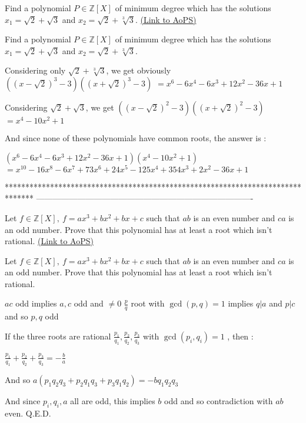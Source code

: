 \begin{problem}
	Find a polynomial $P\in \mathbb{Z}[X]$ of minimum degree which has the solutions $x_1=\sqrt{2}+\sqrt{3}$ and $x_2=\sqrt{2}+\sqrt[3]{3}$.
	\flushright \href{https://artofproblemsolving.com/community/c6h393654}{(Link to AoPS)}
\end{problem}



\begin{solution}
	\begin{tcolorbox}Find a polynomial $P\in \mathbb{Z}[X]$ of minimum degree which has the solutions $x_1=\sqrt{2}+\sqrt{3}$ and $x_2=\sqrt{2}+\sqrt[3]{3}$.\end{tcolorbox}
Considering only $\sqrt 2+\sqrt[3]3$, we get obviously $((x-\sqrt2)^3-3)((x+\sqrt 2)^3-3)$ $=x^6-6x^4-6x^3+12x^2-36x+1$

Considering $\sqrt 2+\sqrt 3$, we get $((x-\sqrt 2)^2-3)((x+\sqrt 2)^2-3)$ $=x^4-10x^2+1$

And since none of these polynomials have common roots, the answer is :

$(x^6-6x^4-6x^3+12x^2-36x+1)(x^4-10x^2+1)$ $=x^{10}-16x^8-6x^7+73x^6+24x^5-125x^4+354x^3+2x^2-36x+1$
\end{solution}
*******************************************************************************
-------------------------------------------------------------------------------

\begin{problem}
	Let $f\in \mathbb{Z}[X],\ f=ax^3+bx^2+bx+c$ such that $ab$ is an even number and $ca$ is an odd number. Prove that this polynomial has at least a root which isn't rational.
	\flushright \href{https://artofproblemsolving.com/community/c6h393855}{(Link to AoPS)}
\end{problem}



\begin{solution}
	\begin{tcolorbox}Let $f\in \mathbb{Z}[X],\ f=ax^3+bx^2+bx+c$ such that $ab$ is an even number and $ca$ is an odd number. Prove that this polynomial has at least a root which isn't rational.\end{tcolorbox}
$ac$ odd implies $a,c$ odd and $\ne 0$
$\frac pq$ root with $\gcd(p,q)=1$ implies $q|a$ and $p|c$ and so $p,q$ odd

If the three roots are rational $\frac {p_1}{q_1},\frac {p_2}{q_2},\frac {p_3}{q_3}$ with $\gcd(p_i,q_i)=1$ , then :

$\frac {p_1}{q_1}+\frac {p_2}{q_2}+\frac {p_3}{q_3}=-\frac ba$

And so $a(p_1q_2q_3+p_2q_1q_3+p_3q_1q_2)=-bq_1q_2q_3$

And since $p_i,q_i,a$ all are odd, this implies $b$ odd and so contradiction with $ab$ even.
Q.E.D.
\end{solution}



